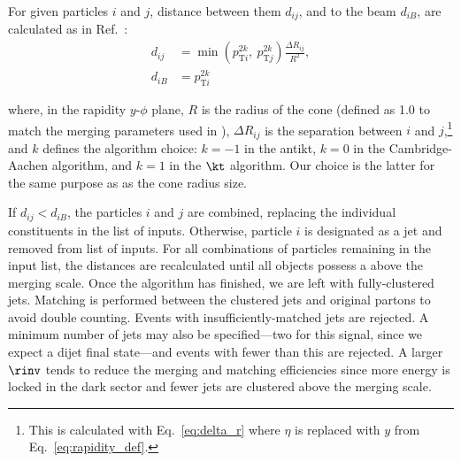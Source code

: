 For given particles $i$ and $j$, distance between them $d_{ij}$, and to the beam $d_{iB}$, are calculated as in Ref.~:
\begin{equation}
    \begin{aligned}
d_{ij} &= \min(p_{\mathrm{T}i}^{2k}, \ p_{\mathrm{T}j}^{2k}) \frac{\Delta R_{ij}}{R^2},\\
d_{iB} &= p_{\mathrm{T}i}^{2k}
    \end{aligned}
    \label{eq:distances_kt_pythia}
\end{equation}

where, in the rapidity $y$-$\phi$ plane, $R$ is the radius of the cone (defined as 1.0 to match the merging parameters used in \MADGRAPH), $\Delta R_{ij}$ is the separation between $i$ and $j$,\footnote{This is calculated with Eq.~\ref{eq:delta_r} where $\eta$ is replaced with $y$ from Eq.~\ref{eq:rapidity_def}.} and $k$ defines the algorithm choice: $k = -\text{1}$ in the \gls{antikt}, $k = \text{0}$ in the Cambridge-Aachen algorithm, and $k = \text{1}$ in the $\kt$ algorithm. Our choice is the latter for the same purpose as as the cone radius size.

If $d_{ij} < d_{iB}$, the particles $i$ and $j$ are combined, replacing the individual constituents in the list of inputs. Otherwise, particle $i$ is designated as a jet and removed from list of inputs. For all combinations of particles remaining in the input list, the distances are recalculated until all objects possess a \pt above the merging scale. Once the algorithm has finished, we are left with fully-clustered \glspl{jet}. Matching is performed between the clustered jets and original partons to avoid double counting. Events with insufficiently-matched jets are rejected. A minimum number of \glspl{jet} may also be specified---two for this signal, since we expect a dijet final state---and events with fewer than this are rejected. A larger $\rinv$ tends to reduce the merging and matching efficiencies since more energy is locked in the dark sector and fewer jets are clustered above the merging scale.





